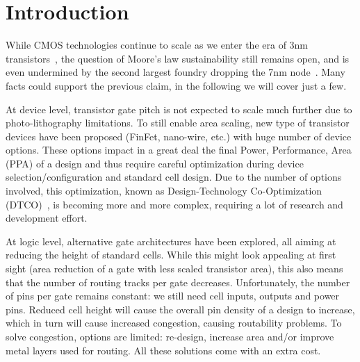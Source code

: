 \documentclass[conference]{IEEEtran}
\begin{document}

\section{Introduction}
While CMOS technologies continue to scale as we enter the era of 3nm transistors~\cite{imec3nm}, the question of Moore's law sustainability still remains open, and is even undermined by the second largest foundry dropping the 7nm node~\cite{gf2018}. Many facts could support the previous claim, in the following we will cover just a few.

At device level, transistor gate pitch is not expected to scale much further due to photo-lithography limitations. To still enable area scaling, new type of transistor devices have been proposed (FinFet, nano-wire, etc.) with huge number of device options. These options impact in a great deal the final Power, Performance, Area (PPA) of a design and thus require careful optimization during device selection/configuration and standard cell design. Due to the number of options involved, this optimization, known as Design-Technology Co-Optimization (DTCO)~\cite{Mattii2017}, is becoming more and more complex, requiring a lot of research and development effort.

At logic level, alternative gate architectures have been explored, all aiming at reducing the height of standard cells. While this might look appealing at first sight (area reduction of a gate with less scaled transistor area), this also means that the number of routing tracks per gate decreases. Unfortunately, the number of pins per gate remains constant: we still need cell inputs, outputs and power pins. Reduced cell height will cause the overall pin density of a design to increase, which in turn will cause increased congestion, causing routability problems. To solve congestion, options are limited: re-design, increase area and/or improve metal layers used for routing. All these solutions come with an extra cost.
\end{document}
